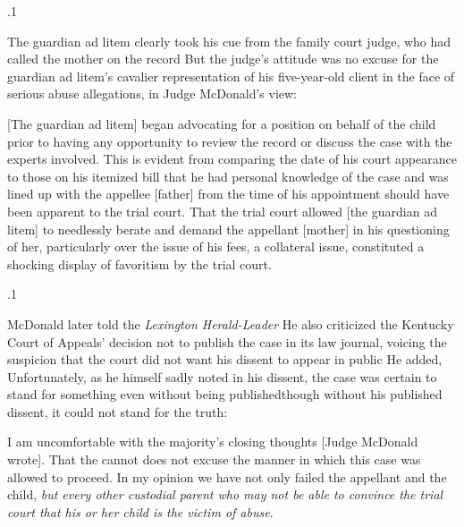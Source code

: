 \documentclass[11pt, twoside]{article}
\begin{document}
{\p.1{%
The guardian ad litem clearly took his cue from the family court judge,
who had called the mother on the record  But the judge’s attitude was no
excuse for the guardian ad litem’s cavalier representation of his
five-year-old client in the face of serious abuse allegations, in Judge McDonald’s
view:

\begin{blockQuote}
{[The guardian ad litem]} began advocating for a position on behalf
of the child prior to having any opportunity to review the record
or discuss the case with the experts involved. This is evident from
comparing the date of his court appearance to those on his itemized
bill that he had personal knowledge of the case and was lined up
with the appellee [father] from the time of his appointment should
have been apparent to the trial court. That the trial court allowed
[the guardian ad litem] to needlessly berate and demand the appellant [mother] in his questioning of her, particularly over the
issue of his fees, a collateral issue, constituted a shocking display
of favoritism by the trial court.
\end{blockQuote}

}%

\p.1{%
McDonald later told the \textit{Lexington Herald-Leader}  He also criticized the Kentucky Court
of Appeals’ decision not to publish the case in its law journal, voicing
the suspicion that the court did not want his dissent to appear in public
 He added,
Unfortunately, as he himself sadly noted in his dissent, the case was certain to stand for something even without being published\mdash{}though
without his published dissent, it could not stand for the truth:

\begin{blockQuote}
I am uncomfortable with the majority’s closing thoughts [Judge
McDonald wrote]. That the  cannot 
does not excuse the manner in which this case was allowed to
proceed. In my opinion we have not only failed the appellant and
the child, \textit{but every other custodial parent who may not be able to
convince the trial court that his or her child is the victim of abuse}.
\end{blockQuote}

}}
\end{document}
